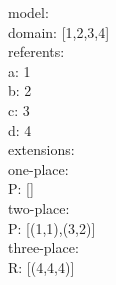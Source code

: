 \documentclass[12pt,a4paper]{article}
\begin{document}
\noindent
model:\\
\hspace*{1em}  domain: [1,2,3,4]\\
\hspace*{1em}  referents: \\
\hspace*{3em} a: 1 \\
\hspace*{3em} b: 2 \\
\hspace*{3em} c: 3 \\
\hspace*{3em} d: 4\\
\hspace*{1em}  extensions:\\
\hspace*{2em}    one-place: \\
\hspace*{4em} P: []\\
\hspace*{2em}    two-place: \\
\hspace*{4em} P: [(1,1),(3,2)]\\
\hspace*{2em}    three-place: \\
\hspace*{4em} R: [(4,4,4)]\\
\end{document}

